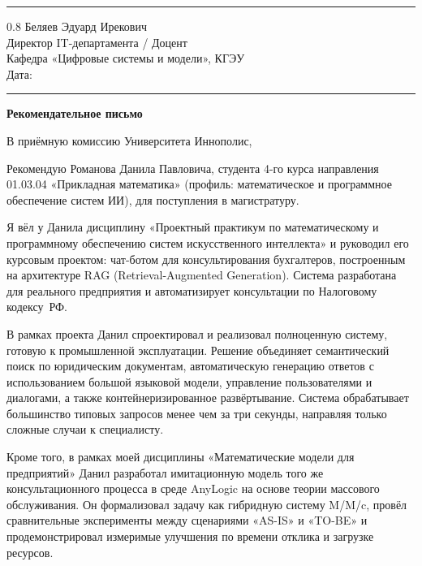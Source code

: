 \documentclass[a4paper,12pt]{article}
\begin{document}
\vspace{4pt}
\noindent\rule{\textwidth}{0.8pt}

\begin{flushright}
  \begin{spacing}{0.8}
    Беляев Эдуард Ирекович\\
    Директор IT-департамента / Доцент\\
    Кафедра «Цифровые системы и модели», КГЭУ\\[6pt]
    Дата: \rule{4cm}{0.4pt}
  \end{spacing}
\end{flushright}

\begin{center}
  {\Large\bfseries Рекомендательное письмо}
\end{center}

В приёмную комиссию Университета Иннополис,

Рекомендую Романова Данила Павловича, студента 4-го курса направления 01.03.04 «Прикладная математика» (профиль: ма\-те\-ма\-ти\-че\-ское и про\-грамм\-ное обес\-пе\-че\-ние систем ИИ), для по\-сту\-пле\-ния в ма\-ги\-стра\-ту\-ру.

Я вёл у Данила дисциплину «Проектный практикум по математическому и программному обеспечению систем искусственного интеллекта» и руководил его курсовым проектом: чат-ботом для консультирования бухгалтеров, построенным на архитектуре RAG (Retrieval-Augmented Generation). Система разработана для реального предприятия и автоматизирует консультации по Налоговому кодексу~РФ.

В рамках проекта Данил спроектировал и реализовал полноценную систему, готовую к промышленной эксплуатации. Решение объединяет семантический поиск по юридическим документам, автоматическую генерацию ответов с использованием большой языковой модели, управление пользователями и диалогами, а также контейнеризированное развёртывание. Система обрабатывает большинство типовых запросов менее чем за три секунды, направляя только сложные случаи к специалисту.

Кроме того, в рамках моей дисциплины «Математические модели для предприятий» Данил разработал имитационную модель того же консультационного процесса в среде AnyLogic на основе теории массового обслуживания. Он формализовал задачу как гибридную систему M/M/c, провёл сравнительные эксперименты между сценариями «AS-IS» и «TO-BE» и продемонстрировал измеримые улучшения по времени отклика и загрузке ресурсов.
\end{document}
